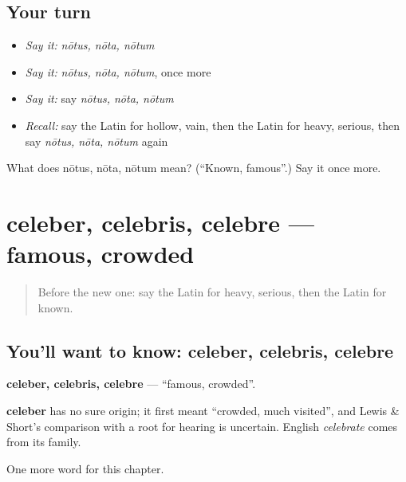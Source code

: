 \subsection*{Your turn}
\begin{itemize}
\raggedright
  \item \emph{Say it:} \emph{nōtus, nōta, nōtum}
  \item \emph{Say it:} \emph{nōtus, nōta, nōtum}, once more
  \item \emph{Say it:} say \emph{nōtus, nōta, nōtum}
  \item \emph{Recall:} say the Latin for hollow, vain, then the Latin for heavy, serious, then say \emph{nōtus, nōta, nōtum} again
\end{itemize}

\begin{tcolorbox}[breakable,colback=teal!4,colframe=teal!35!black,title={Before you move on}]
What does nōtus, nōta, nōtum mean? (\textquotedblleft{}Known, famous\textquotedblright{}.) Say it once more.
\end{tcolorbox}
\section[celeber, celebris, celebre]{celeber, celebris, celebre — famous, crowded}

\label{lesson:LA-C183-celeber}



\begin{quote}
Before the new one: say the Latin for heavy, serious, then the Latin for known.
\end{quote}

\subsection*{You'll want to know: celeber, celebris, celebre}
\textbf{celeber, celebris, celebre} — \textquotedblleft{}famous, crowded\textquotedblright{}.

\begin{cousinweb}
\textbf{celeber} has no sure origin; it first meant \textquotedblleft{}crowded, much visited\textquotedblright{}, and Lewis \& Short's comparison with a root for hearing is uncertain. English \emph{celebrate} comes from its family.
\end{cousinweb}

\begin{grammarlens}[title={What you've built}]
One more word for this chapter.
\end{grammarlens}

